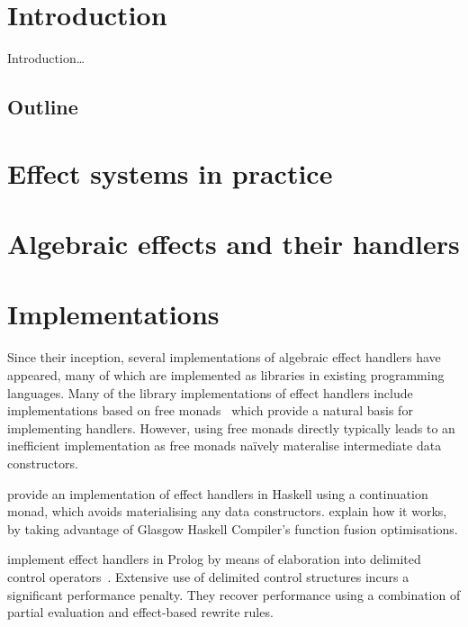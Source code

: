 \documentclass[letterpaper,10pt]{article}
\title{\thetitle{}}
\author{\theauthor{}\\\theaffiliation{}\\\theemail{}}
\date{\small{\today}}
\begin{document}
\maketitle

\begin{abstract}
An abstract will appear here\dots
\end{abstract}

\section{Introduction}
Introduction\dots

\subsection{Outline}

\section{Effect systems in practice}

\section{Algebraic effects and their handlers}

\section{Implementations}
Since their inception, several implementations of algebraic effect
handlers have appeared, many of which are implemented as libraries in
existing programming languages.
%
%
Many of the library implementations of effect handlers include
implementations based on free monads~\cite{KammarLO13, KiselyovSS13,
  KiselyovI15, Brady13, WuSH14} which provide a natural basis for
implementing handlers. However, using free monads directly typically
leads to an inefficient implementation as free monads naïvely
materalise intermediate data constructors.

\citet{KammarLO13} provide an implementation of effect handlers in
Haskell using a continuation monad, which avoids materialising any
data constructors. \citet{WuS15} explain how it works, by taking
advantage of Glasgow Haskell Compiler's function fusion
optimisations.

\citet{SalehS16} implement effect handlers in Prolog by means of
elaboration into delimited control
operators~\cite{SchrijversDDW13}. Extensive use of delimited control
structures incurs a significant performance penalty. They recover
performance using a combination of partial evaluation and effect-based
rewrite rules.
\end{document}
